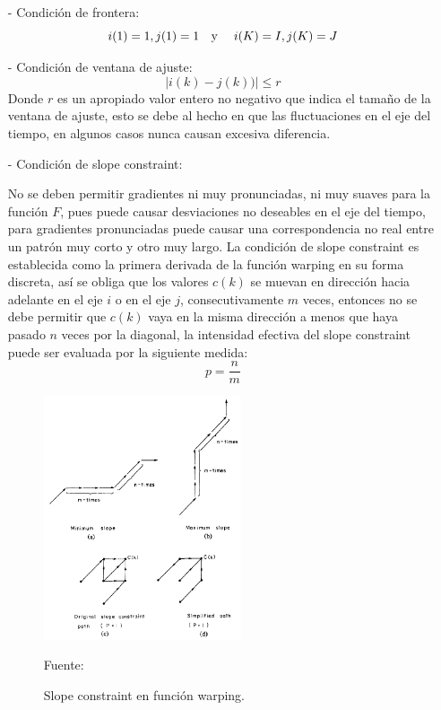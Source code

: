 \begin{enumerate}
\begin{enumerate}
\begin{enumerate}
\item[-]Condición de frontera:
\begin{equation}
\label{eq:ecuacion83}
i(1) = 1, j(1) = 1
\text{\quad y \quad}
i(K) = I, j(K) = J
\end{equation}

\item[-]Condición de ventana de ajuste:
\begin{equation}
\label{eq:ecuacion84}
\left | i(k) - j(k)) \right | \leq  r
\end{equation}
Donde $r$ es un apropiado valor entero no negativo que indica el tamaño de la ventana de ajuste, esto se debe al hecho en que las fluctuaciones en el eje del tiempo, en algunos casos nunca causan excesiva diferencia.

\item[-]Condición de slope constraint:
\par
No se deben permitir gradientes ni muy pronunciadas, ni muy suaves para la función $F$, pues puede causar desviaciones no deseables en el eje del tiempo, para gradientes pronunciadas puede causar una correspondencia no real entre un patrón muy corto y otro muy largo.
\vskip 0.5cm
La condición de slope constraint es establecida como la primera derivada de la función warping en su forma discreta, así se obliga que los valores $c(k)$ se muevan en dirección hacia adelante en el eje $i$ o en el eje $j$, consecutivamente $m$ veces, entonces no se debe permitir que $c(k)$ vaya en la misma dirección a menos que haya pasado $n$ veces por la diagonal, la intensidad efectiva del slope constraint puede ser evaluada por la siguiente medida:
\begin{equation}
\label{eq:ecuacion85}
p = \frac{n}{m}
\end{equation}

\begin{figure}[H]
\begin{center}
\includegraphics[width=0.55\textwidth]{Imagenes/Cap2/image054}
\end{center}
\begin{center}
\vskip -0.5cm
\caption{\small{Slope constraint en función warping.}}
\label{fig:figura2.53}
{\small{Fuente: \cite{sakoe}}}
\end{center}
\end{figure}


\end{enumerate}
\end{enumerate}
\end{enumerate}
